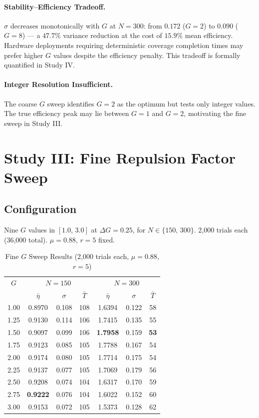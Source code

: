 \documentclass[journal,compsoc]{IEEEtran}
\begin{document}
\paragraph{Stability--Efficiency Tradeoff.}
$\sigma$ decreases monotonically with $G$ at $N=300$: from $0.172$ ($G=2$) to $0.090$
($G=8$) --- a $47.7\%$ variance reduction at the cost of $15.9\%$ mean efficiency.
Hardware deployments requiring deterministic coverage completion times may prefer
higher $G$ values despite the efficiency penalty. This tradeoff is formally quantified
in Study IV.

\paragraph{Integer Resolution Insufficient.}
The coarse $G$ sweep identifies $G=2$ as the optimum but tests only integer values.
The true efficiency peak may lie between $G=1$ and $G=2$, motivating the fine sweep
in Study III.

\section{Study III: Fine Repulsion Factor Sweep}
\label{sec:fgsweep}

\subsection{Configuration}
Nine $G$ values in $[1.0,\,3.0]$ at $\Delta G=0.25$, for $N\in\{150,\,300\}$.
2{,}000 trials each (36{,}000 total). $\mu=0.88$, $r=5$ fixed.

\begin{table}[H]
\renewcommand{\arraystretch}{1.3}
\caption{Fine $G$ Sweep Results (2,000 trials each, $\mu=0.88$, $r=5$)}
\label{tab:fgsweep}
\centering
\begin{tabular}{ccccccc}
\hline
$G$ & \multicolumn{3}{c}{$N=150$} & \multicolumn{3}{c}{$N=300$} \\
    & $\bar{\eta}$ & $\sigma$ & $\bar{T}$ & $\bar{\eta}$ & $\sigma$ & $\bar{T}$ \\
\hline
1.00 & 0.8970 & 0.108 & 108 & 1.6394 & 0.122 & 58 \\
1.25 & 0.9130 & 0.114 & 106 & 1.7415 & 0.135 & 55 \\
1.50 & 0.9097 & 0.099 & 106 & \textbf{1.7958} & 0.159 & \textbf{53} \\
1.75 & 0.9123 & 0.085 & 105 & 1.7788 & 0.167 & 54 \\
2.00 & 0.9174 & 0.080 & 105 & 1.7714 & 0.175 & 54 \\
2.25 & 0.9137 & 0.077 & 105 & 1.7069 & 0.179 & 56 \\
2.50 & 0.9208 & 0.074 & 104 & 1.6317 & 0.170 & 59 \\
2.75 & \textbf{0.9222} & 0.076 & 104 & 1.6022 & 0.152 & 60 \\
3.00 & 0.9153 & 0.072 & 105 & 1.5373 & 0.128 & 62 \\
\hline
\end{tabular}
\end{table}
\end{document}
